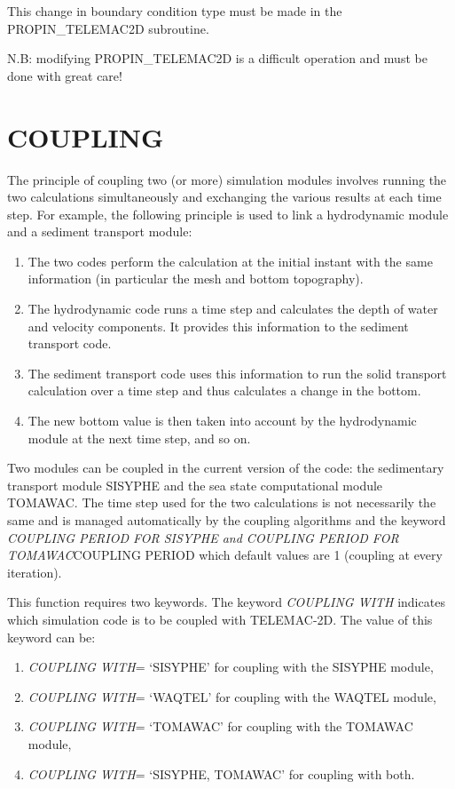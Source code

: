 This change in boundary condition type must be made in the PROPIN\_TELEMAC2D subroutine.

 N.B: modifying PROPIN\_TELEMAC2D is a difficult operation and must be done with great care!


\section{ COUPLING}

 The principle of coupling two (or more) simulation modules involves running the two calculations simultaneously and exchanging the various results at each time step. For example, the following principle is used to link a hydrodynamic module and a sediment transport module:

\begin{enumerate}
\item  The two codes perform the calculation at the initial instant with the same information (in particular the mesh and bottom topography).

\item  The hydrodynamic code runs a time step and calculates the depth of water and velocity components. It provides this information to the sediment transport code.

\item  The sediment transport code uses this information to run the solid transport calculation over a time step and thus calculates a change in the bottom.

\item  The new bottom value is then taken into account by the hydrodynamic module at the next time step, and so on.
\end{enumerate}

 Two modules can be coupled in the current version of the code: the sedimentary transport module SISYPHE and the sea state computational module TOMAWAC. The time step used for the two calculations is not necessarily the same and is managed automatically by the coupling algorithms and the keyword \textit{COUPLING PERIOD FOR SISYPHE and COUPLING PERIOD FOR TOMAWAC}COUPLING PERIOD which default values are 1 (coupling at every iteration).

 This function requires two keywords. The keyword \textit{COUPLING WITH} indicates which simulation code is to be coupled with TELEMAC-2D. The value of this keyword can be:

\begin{enumerate}
\item  \textit{COUPLING WITH}= `SISYPHE' for coupling with the SISYPHE module,

\item  \textit{COUPLING WITH}= `WAQTEL' for coupling with the WAQTEL module,

\item  \textit{COUPLING WITH}= `TOMAWAC' for coupling with the TOMAWAC module,

\item  \textit{COUPLING WITH}= `SISYPHE, TOMAWAC' for coupling with both.
\end{enumerate}

